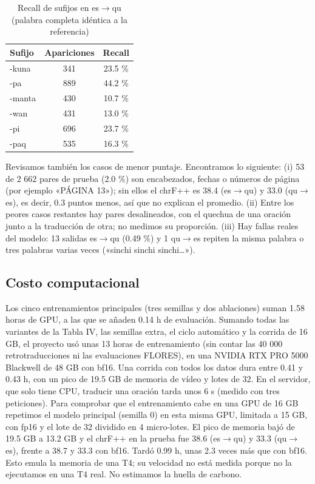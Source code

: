 \documentclass[conference]{IEEEtran}
\begin{document}
\begin{table}[!t]
\caption{Recall de sufijos en es$\rightarrow$qu (palabra completa idéntica a la referencia)}
\label{tab:sufijos}
\centering\small
\begin{tabular}{lcc}
\toprule
Sufijo & Apariciones & Recall \\
\midrule
-kuna & 341 & 23.5 \% \\
-pa & 889 & 44.2 \% \\
-manta & 430 & 10.7 \% \\
-wan & 431 & 13.0 \% \\
-pi & 696 & 23.7 \% \\
-paq & 535 & 16.3 \% \\
\bottomrule
\end{tabular}
\end{table}
Revisamos también los casos de menor puntaje. Encontramos lo siguiente: (i) 53 de 2 662 pares de prueba (2.0 \%) son encabezados, fechas o números de página (por ejemplo «PÁGINA 13»); sin ellos el chrF++ es 38.4 (es$\rightarrow$qu) y 33.0 (qu$\rightarrow$es), es decir, 0.3 puntos menos, así que no explican el promedio. (ii) Entre los peores casos restantes hay pares desalineados, con el quechua de una oración junto a la traducción de otra; no medimos su proporción. (iii) Hay fallas reales del modelo: 13 salidas es$\rightarrow$qu (0.49 \%) y 1 qu$\rightarrow$es repiten la misma palabra o tres palabras varias veces («sinchi sinchi sinchi…»).

\subsection{Costo computacional}
Los cinco entrenamientos principales (tres semillas y dos ablaciones) suman 1.58 horas de GPU, a las que se añaden 0.14 h de evaluación. Sumando todas las variantes de la Tabla IV, las semillas extra, el ciclo automático y la corrida de 16 GB, el proyecto usó unas 13 horas de entrenamiento (sin contar las 40 000 retrotraducciones ni las evaluaciones FLORES), en una NVIDIA RTX PRO 5000 Blackwell de 48 GB con bf16. Una corrida con todos los datos dura entre 0.41 y 0.43 h, con un pico de 19.5 GB de memoria de vídeo y lotes de 32. En el servidor, que solo tiene CPU, traducir una oración tarda unos 6 s (medido con tres peticiones). Para comprobar que el entrenamiento cabe en una GPU de 16 GB repetimos el modelo principal (semilla 0) en esta misma GPU, limitada a 15 GB, con fp16 y el lote de 32 dividido en 4 micro-lotes. El pico de memoria bajó de 19.5 GB a 13.2 GB y el chrF++ en la prueba fue 38.6 (es$\rightarrow$qu) y 33.3 (qu$\rightarrow$es), frente a 38.7 y 33.3 con bf16. Tardó 0.99 h, unas 2.3 veces más que con bf16. Esto emula la memoria de una T4; su velocidad no está medida porque no la ejecutamos en una T4 real. No estimamos la huella de carbono.
\end{document}
